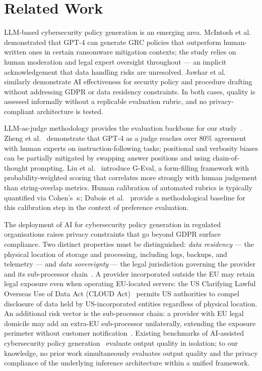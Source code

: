 \documentclass[runningheads]{llncs}
\begin{document}
\section{Related Work}

LLM-based cybersecurity policy generation is an emerging area.
McIntosh et al.~\cite{mcintosh2023harnessing} demonstrated that GPT-4 can
generate GRC policies that outperform human-written ones in certain
ransomware mitigation contexts; the study relies on human moderation and
legal expert oversight throughout — an implicit acknowledgement that data
handling risks are unresolved. Jawhar et al.~\cite{jawhar2024aibased}
similarly demonstrate AI effectiveness for security policy and procedure
drafting without addressing GDPR or data residency constraints. In both
cases, quality is assessed informally without a replicable evaluation
rubric, and no privacy-compliant architecture is tested.

LLM-as-judge methodology provides the evaluation backbone for our
study~\cite{anthropic2024demystifying}. Zheng et al.~\cite{zheng2023judging}
demonstrate that GPT-4 as a judge reaches over 80\% agreement with human
experts on instruction-following tasks; positional and verbosity biases can be
partially mitigated by swapping answer positions and using chain-of-thought
prompting. Liu et al.~\cite{liu2023geval} introduce G-Eval, a form-filling
framework with probability-weighted scoring that correlates more strongly with
human judgement than string-overlap metrics. Human calibration of automated
rubrics is typically quantified via Cohen's~$\kappa$; Dubois et
al.~\cite{dubois2023alpacafarm} provide a methodological baseline for this
calibration step in the context of preference evaluation.

The deployment of AI for cybersecurity policy generation in regulated
organisations raises privacy constraints that go beyond GDPR surface
compliance. Two distinct properties must be distinguished:
\textit{data residency} — the physical location of storage and processing,
including logs, backups, and telemetry — and \textit{data sovereignty} — the
legal jurisdiction governing the provider and its sub-processor
chain~\cite{gdpr2016,schremsii2020}. A provider incorporated outside the EU
may retain legal exposure even when operating EU-located servers: the US
Clarifying Lawful Overseas Use of Data Act (CLOUD Act)~\cite{cloudact2018}
permits US authorities to compel disclosure of data held by US-incorporated
entities regardless of physical location. An additional risk vector is the
sub-processor chain: a provider with EU legal domicile may add an extra-EU
sub-processor unilaterally, extending the exposure perimeter without customer
notification~\cite{gdpr2016}. Existing benchmarks of AI-assisted
cybersecurity policy generation~\cite{mcintosh2023harnessing,jawhar2024aibased}
evaluate output quality in isolation; to our knowledge, no prior work
simultaneously evaluates output quality and the privacy compliance of the
underlying inference architecture within a unified framework.
\end{document}
